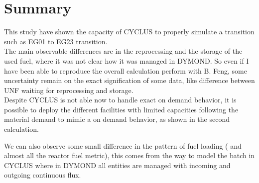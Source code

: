\documentclass[12pt]{article}
\begin{document}
\section{Summary}
This study have shown the capacity of CYCLUS to
properly simulate a transition such as EG01 to
EG23 transition.\\
The main observable differences are in the
reprocessing and the storage of the used fuel,
where it was not clear how it was managed in
DYMOND. So even if I have been able to reproduce
the overall calculation perform with B. Feng, some
uncertainty remain on the exact signification of
some data, like difference between UNF waiting for
reprocessing and storage.\\
Despite CYCLUS is not able now to handle exact on
demand behavior, it is possible to deploy the
different facilities with limited capacities
following the material demand to mimic a on demand
behavior, as shown in the second calculation.

We can also observe some small difference in the
pattern of fuel loading ( and almost all the
reactor fuel metric), this comes from the way to
model the batch in CYCLUS where in DYMOND all
entities are managed with incoming and outgoing
continuous flux.







\end{document}
